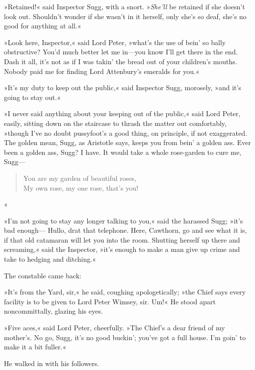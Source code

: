 »Retained!« said Inspector Sugg, with a snort. »\textit{She'll} be retained if she doesn't look out. Shouldn't wonder if she wasn't in it herself, only she's so deaf, she's no good for anything at all.«

»Look here, Inspector,« said Lord Peter, »what's the use of bein' so bally obstructive? You'd much better let me in—you know I'll get there in the end. Dash it all, it's not as if I was takin' the bread out of your children's mouths. Nobody paid me for finding Lord Attenbury's emeralds for you.«

»It's my duty to keep out the public,« said Inspector Sugg, morosely, »and it's going to stay out.«

»I never said anything about your keeping out of the public,« said Lord Peter, easily, sitting down on the staircase to thrash the matter out comfortably, »though I've no doubt pussyfoot's a good thing, on principle, if not exaggerated. The golden mean, Sugg, as Aristotle says, keeps you from bein' a golden ass. Ever been a golden ass, Sugg? I have. It would take a whole rose-garden to cure me, Sugg—

\begin{verse}
You are my garden of beautiful roses,\\
My own rose, my one rose, that's you!\\
\end{verse}«

»I'm not going to stay any longer talking to you,« said the harassed Sugg; »it's bad enough— Hullo, drat that telephone. Here, Cawthorn, go and see what it is, if that old catamaran will let you into the room. Shutting herself up there and screaming,« said the Inspector, »it's enough to make a man give up crime and take to hedging and ditching.«

The constable came back:

»It's from the Yard, sir,« he said, coughing apologetically; »the Chief says every facility is to be given to Lord Peter Wimsey, sir. Um!« He stood apart noncommittally, glazing his eyes.

»Five aces,« said Lord Peter, cheerfully. »The Chief's a dear friend of my mother's. No go, Sugg, it's no good buckin'; you've got a full house. I'm goin' to make it a bit fuller.«

He walked in with his followers.

